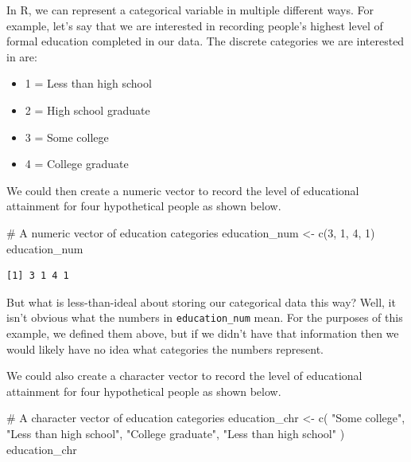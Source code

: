 \documentclass[
  letterpaper,
  DIV=11,
  numbers=noendperiod]{scrreprt}
\newenvironment{Shaded}{\begin{snugshade}}{\end{snugshade}}
\newcommand{\CommentTok}[1]{\textcolor[rgb]{0.37,0.37,0.37}{#1}}
\newcommand{\DecValTok}[1]{\textcolor[rgb]{0.68,0.00,0.00}{#1}}
\newcommand{\FunctionTok}[1]{\textcolor[rgb]{0.28,0.35,0.67}{#1}}
\newcommand{\NormalTok}[1]{\textcolor[rgb]{0.00,0.23,0.31}{#1}}
\newcommand{\OtherTok}[1]{\textcolor[rgb]{0.00,0.23,0.31}{#1}}
\newcommand{\StringTok}[1]{\textcolor[rgb]{0.13,0.47,0.30}{#1}}
\begin{document}
In R, we can represent a categorical variable in multiple different
ways. For example, let's say that we are interested in recording
people's highest level of formal education completed in our data. The
discrete categories we are interested in are:

\begin{itemize}
\item
  1 = Less than high school
\item
  2 = High school graduate
\item
  3 = Some college
\item
  4 = College graduate
\end{itemize}

We could then create a numeric vector to record the level of educational
attainment for four hypothetical people as shown below.

\begin{Shaded}
\begin{Highlighting}[]
\CommentTok{\# A numeric vector of education categories}
\NormalTok{education\_num }\OtherTok{\textless{}{-}} \FunctionTok{c}\NormalTok{(}\DecValTok{3}\NormalTok{, }\DecValTok{1}\NormalTok{, }\DecValTok{4}\NormalTok{, }\DecValTok{1}\NormalTok{)}
\NormalTok{education\_num}
\end{Highlighting}
\end{Shaded}

\begin{verbatim}
[1] 3 1 4 1
\end{verbatim}

But what is less-than-ideal about storing our categorical data this way?
Well, it isn't obvious what the numbers in \texttt{education\_num} mean.
For the purposes of this example, we defined them above, but if we
didn't have that information then we would likely have no idea what
categories the numbers represent.

We could also create a character vector to record the level of
educational attainment for four hypothetical people as shown below.

\begin{Shaded}
\begin{Highlighting}[]
\CommentTok{\# A character vector of education categories}
\NormalTok{education\_chr }\OtherTok{\textless{}{-}} \FunctionTok{c}\NormalTok{(}
  \StringTok{"Some college"}\NormalTok{, }\StringTok{"Less than high school"}\NormalTok{, }\StringTok{"College graduate"}\NormalTok{, }
  \StringTok{"Less than high school"}
\NormalTok{)}
\NormalTok{education\_chr}
\end{Highlighting}
\end{Shaded}
\end{document}
